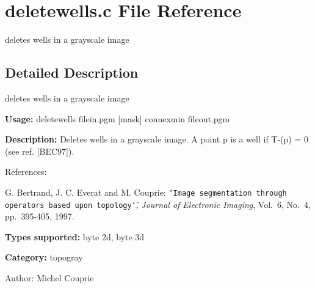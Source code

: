 \section{deletewells.c File Reference}
\label{deletewells_8c}
deletes wells in a grayscale image  




\label{_details}
\subsection{Detailed Description}
deletes wells in a grayscale image 

{\bf Usage:} deletewells filein.pgm [mask] connexmin fileout.pgm

{\bf Description:} Deletes wells in a grayscale image. A point p is a well if T-(p) = 0 (see ref. [BEC97]).

References:\par
 [BEC97] G. Bertrand, J. C. Everat and M. Couprie: {\tt \char`\"{}Image segmentation through operators based upon topology\char`\"{}}, {\em  Journal of Electronic Imaging\/}, Vol.~6, No.~4, pp.~395-405, 1997.\par


{\bf Types supported:} byte 2d, byte 3d

{\bf Category:} topogray

\begin{Desc}
\item[Author:]Michel Couprie \end{Desc}
